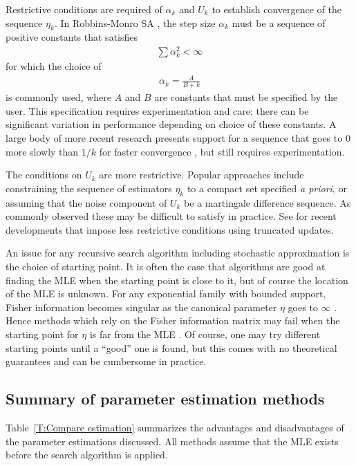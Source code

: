 Restrictive conditions are required of $\alpha_k$ and $U_k$ to establish convergence 
of the sequence $\eta_k$.  
In Robbins-Monro SA \citep{Robbins-Monro}, the step size $\alpha_k$ must be a sequence 
of positive constants 
that satisfies 
\begin{align*}
	\sum \alpha_k^2 < \infty
\end{align*}
for which the choice of
\begin{align} \label{E:SA step size}
	\alpha_k = \frac{A}{B + k}
\end{align}
 is commonly used, where $A$ and $B$ are constants that must be specified by the user.  
This specification requires experimentation and care: there can be significant 
variation in performance depending on choice of these constants. 
A large body of more recent research presents support for a sequence that goes to 0 
more slowly than $1/k$ 
for faster convergence \citep[Chapter 11]{Kushner:1997}, but still requires 
experimentation.  

The conditions on $U_k$ are more restrictive.  Popular approaches include constraining 
the sequence of estimators $\eta_k$ to a compact set specified \emph{a priori}, 
or assuming that the noise component of $U_k$ be a martingale 
difference sequence.  As commonly observed \citep*{Chen:2002,Andrieu:2005,Liang:2010} 
these may be 
difficult to satisfy in practice.  
See \citep{Andrieu:2005,Liang:2010} for recent developments that impose less 
restrictive conditions using truncated 
updates.

An issue for any recursive search algorithm including stochastic approximation is the 
choice of starting point.  It is 
often the case that algorithms are good at finding the MLE when the starting point is 
close to it, but of course the 
location of the MLE is unknown.  For any exponential family with bounded support, 
Fisher information 
becomes singular as the canonical parameter $\eta$ goes to $\infty$ \citep*{Rinaldo:2009}.
Hence methods which rely on 
the Fisher information matrix may fail when the starting point for $\eta$ is far from 
the MLE \citep{Younes:1989,Gu:2001}.
Of course, one may try different starting points until a ``good'' one is found, but 
this comes with no theoretical guarantees and can be cumbersome in practice.

\subsection{Summary of parameter estimation methods}
Table~\ref{T:Compare estimation} summarizes the advantages and disadvantages of the parameter estimations discussed.  
All methods assume that the MLE exists before the search algorithm is applied.

